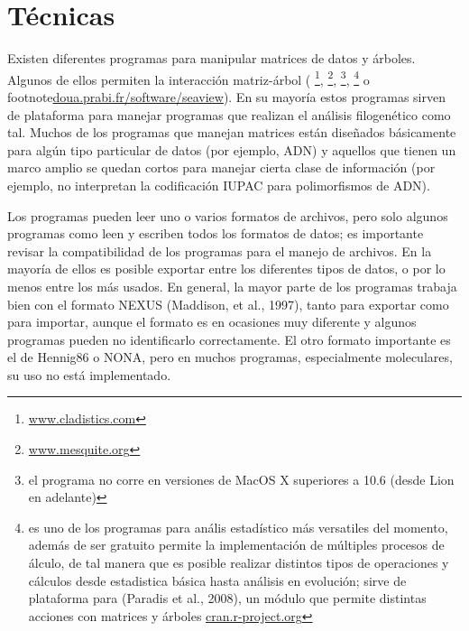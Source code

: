 \section*{T\'ecnicas}

Existen diferentes programas para manipular matrices de datos y \'arboles. Algunos de ellos permiten la interacci\'on matriz-\'arbol (
\footnote{\url{www.cladistics.com}}, 
\footnote{\url{www.mesquite.org}}, 
\footnote{el programa no corre en versiones de MacOS X superiores a 10.6 (desde Lion en adelante)}, 
\footnote{
 es uno de los programas para an\'alis estad\'istico m\'as versatiles del momento, adem\'as de ser gratuito permite la implementaci\'on de m\'ultiples procesos de \'alculo, de tal manera que es posible realizar distintos tipos de operaciones y c\'alculos desde estadistica b\'asica hasta an\'alisis en evoluci\'on; sirve de plataforma para  %
(Paradis et al., 2008), un m\'odulo que permite distintas acciones con matrices y \'arboles 
\url{cran.r-project.org}}  o 
footnote{\url{doua.prabi.fr/software/seaview}}). En su mayor\'ia estos programas sirven de plataforma para manejar programas que realizan el an\'alisis filogen\'etico como tal. Muchos de los programas que manejan matrices est\'an dise\~nados b\'asicamente para alg\'un tipo particular de datos (por ejemplo, ADN) y aquellos que tienen un marco amplio se quedan cortos para manejar cierta clase de informaci\'on (por ejemplo, no interpretan la codificaci\'on IUPAC para polimorfismos de ADN).

Los programas pueden leer uno o varios formatos de archivos, pero solo algunos programas como  leen y escriben todos los formatos de datos; es importante revisar la compatibilidad de los programas para el manejo de archivos. En la mayor\'ia de ellos es posible exportar entre los diferentes tipos de datos, o por lo menos entre los m\'as usados. En general, la mayor parte de los programas trabaja bien con el formato NEXUS (Maddison, et al., 1997), 
tanto para exportar como para importar, aunque el formato es en ocasiones muy diferente y algunos programas pueden no identificarlo correctamente. El otro formato importante es el de Hennig86 o NONA, pero en muchos programas, especialmente moleculares, su uso no est\'a implementado.

